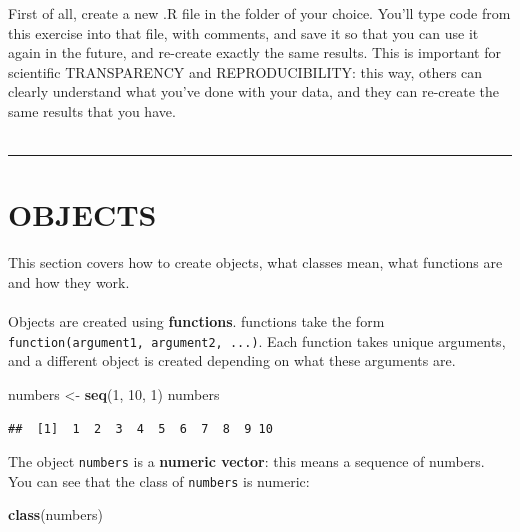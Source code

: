 \documentclass[
]{book}
\newenvironment{Shaded}{\begin{snugshade}}{\end{snugshade}}
\newcommand{\DecValTok}[1]{\textcolor[rgb]{0.00,0.00,0.81}{#1}}
\newcommand{\KeywordTok}[1]{\textcolor[rgb]{0.13,0.29,0.53}{\textbf{#1}}}
\newcommand{\NormalTok}[1]{#1}
\newcommand{\StringTok}[1]{\textcolor[rgb]{0.31,0.60,0.02}{#1}}
\begin{document}
First of all, create a new .R file in the folder of your choice. You'll type
code from this exercise into that file, with comments, and save it so that
you can use it again in the future, and re-create exactly the same results.
This is important for scientific TRANSPARENCY and REPRODUCIBILITY: this
way, others can clearly understand what you've done with your data, and
they can re-create the same results that you have.\\
~\\

\begin{center}\rule{0.5\linewidth}{0.5pt}\end{center}

\hypertarget{objects}{%
\section{OBJECTS}\label{objects}}

This section covers how to create objects, what classes mean, what functions
are and how they work.\\
~\\

Objects are created using \textbf{functions}. functions take the form
\texttt{function(argument1,\ argument2,\ ...)}. Each function takes unique arguments,
and a different object is created depending on what these arguments are.

\begin{Shaded}
\begin{Highlighting}[]
\NormalTok{numbers <-}\StringTok{ }\KeywordTok{seq}\NormalTok{(}\DecValTok{1}\NormalTok{, }\DecValTok{10}\NormalTok{, }\DecValTok{1}\NormalTok{)}
\NormalTok{numbers}
\end{Highlighting}
\end{Shaded}

\begin{verbatim}
##  [1]  1  2  3  4  5  6  7  8  9 10
\end{verbatim}

The object \texttt{numbers} is a \textbf{numeric vector}: this means a sequence of
numbers. You can see that the class of \texttt{numbers} is numeric:

\begin{Shaded}
\begin{Highlighting}[]
\KeywordTok{class}\NormalTok{(numbers)}
\end{Highlighting}
\end{Shaded}
\end{document}
